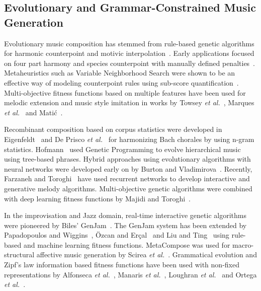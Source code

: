 \documentclass[conference,letterpaper]{IEEEtran}
\newcounter{algorithm}
\begin{document}
\subsection{Evolutionary and Grammar-Constrained Music Generation}
Evolutionary music composition has stemmed from rule-based genetic algorithms for harmonic counterpoint and motivic interpolation~\cite{mcintyre1994,horner1991,maddox2000}. Early applications focused on four part harmony and species counterpoint with manually defined penalties~\cite{donnelly2011,donnelly2012,phonamnuaisuk1999}. Metaheuristics such as Variable Neighborhood Search were shown to be an effective way of modeling counterpoint rules using sub-score quantification~\cite{herremans2012,herremans2013}. Multi-objective fitness functions based on multiple features have been used for melodic extension and music style imitation in works by Towsey \textit{et al.}~\cite{towsey2001}, Marques \textit{et al.}~\cite{marques2000} and Mati{\'c}~\cite{matic2010}.

Recombinant composition based on corpus statistics were developed in Eigenfeldt~\cite{eigenfeldt2012} and De Prisco \textit{et al.}~\cite{deprisco2020} for harmonizing Bach chorales by using n-gram statistics. Hofmann~\cite{hofmann2015} used Genetic Programming to evolve hierarchical music using tree-based phrases. Hybrid approaches using evolutionary algorithms with neural networks were developed early on by Burton and Vladimirova~\cite{burton1998}. Recently, Farzaneh and Toroghi~\cite{farzaneh2019,farzaneh2020} have used recurrent networks to develop interactive and generative melody algorithms. Multi-objective genetic algorithms were combined with deep learning fitness functions by Majidi and Toroghi~\cite{majidi2022}.

In the improvisation and Jazz domain, real-time interactive genetic algorithms were pioneered by Biles' GenJam~\cite{biles1994,biles2001}. The GenJam system has been extended by Papadopoulos and Wiggins~\cite{papadopoulos1998}, {\"O}zcan and Er{\c{c}}al~\cite{ozcan2008} and Liu and Ting~\cite{liuting2019} using rule-based and machine learning fitness functions. MetaCompose was used for macro-structural affective music generation by Scirea \textit{et al.}~\cite{scirea2017}. Grammatical evolution and Zipf's law information based fitness functions have been used with non-fixed representations by Alfonseca \textit{et al.}~\cite{alfonseca2007}, Manaris \textit{et al.}~\cite{manaris2003}, Loughran \textit{et al.}~\cite{loughran2015} and Ortega \textit{et al.}~\cite{ortega2008}.
\end{document}

